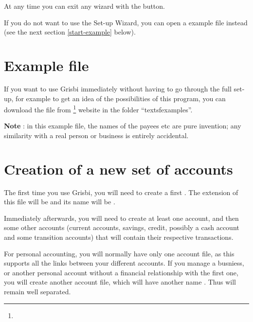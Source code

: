At any time you can exit any wizard with the  button.

If you do not want to use the Set-up Wizard, you can open a example file instead (see the next section \ref{start-example} below).



\section{Example file\label{start-example}}


If you want to use Grisbi immediately without having to go through the full set-up, for example to get an idea of the possibilities of this program, you can download the   file from \footnote{\urlSourceForgeDocumentation{}} website in the folder \enquote{textsf{examples}}.

\textbf{Note} : in this example file, the names of the payees etc are pure invention; any similarity with a real person or business is entirely accidental.

\section{Creation of a new set of accounts\label{start-newfile}}


The first time you use Grisbi, you will need to create a first
. The \gls{extension} of this file will be  and its name will be .

Immediately afterwards, you will need to create at least one account, and then some other accounts (current accounts, savings, credit, possibly a cash account and some transition accounts) that will contain their respective transactions.

For personal accounting, you will normally have only one account file, as this supports all the links between your different accounts. If you manage a busniess, or another personal account without a financial relationship with the first one, you will create another account file, which will have another name . Thus  will remain well separated.



